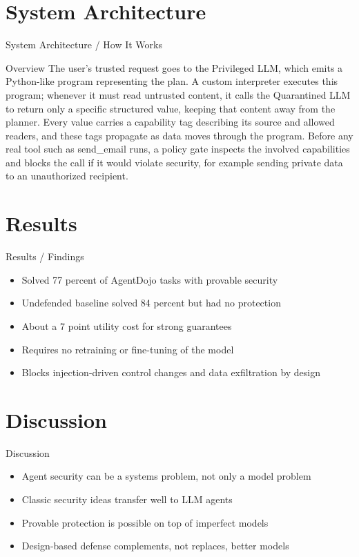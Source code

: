 \documentclass[10pt]{beamer}
\begin{document}
\section{System Architecture}
\begin{frame}{System Architecture / How It Works}
  \begin{block}{Overview}
  The user's trusted request goes to the Privileged LLM, which emits a Python-like program representing the plan. A custom interpreter executes this program; whenever it must read untrusted content, it calls the Quarantined LLM to return only a specific structured value, keeping that content away from the planner. Every value carries a capability tag describing its source and allowed readers, and these tags propagate as data moves through the program. Before any real tool such as send\_email runs, a policy gate inspects the involved capabilities and blocks the call if it would violate security, for example sending private data to an unauthorized recipient.
  \end{block}
\end{frame}

\section{Results}
\begin{frame}[allowframebreaks]{Results / Findings}
\begin{itemize}
  \item Solved 77 percent of AgentDojo tasks with provable security
  \item Undefended baseline solved 84 percent but had no protection
  \item About a 7 point utility cost for strong guarantees
  \item Requires no retraining or fine-tuning of the model
  \item Blocks injection-driven control changes and data exfiltration by design
\end{itemize}
\end{frame}

\section{Discussion}
\begin{frame}{Discussion}
\begin{itemize}
  \item Agent security can be a systems problem, not only a model problem
  \item Classic security ideas transfer well to LLM agents
  \item Provable protection is possible on top of imperfect models
  \item Design-based defense complements, not replaces, better models
\end{itemize}
\end{frame}
\end{document}
